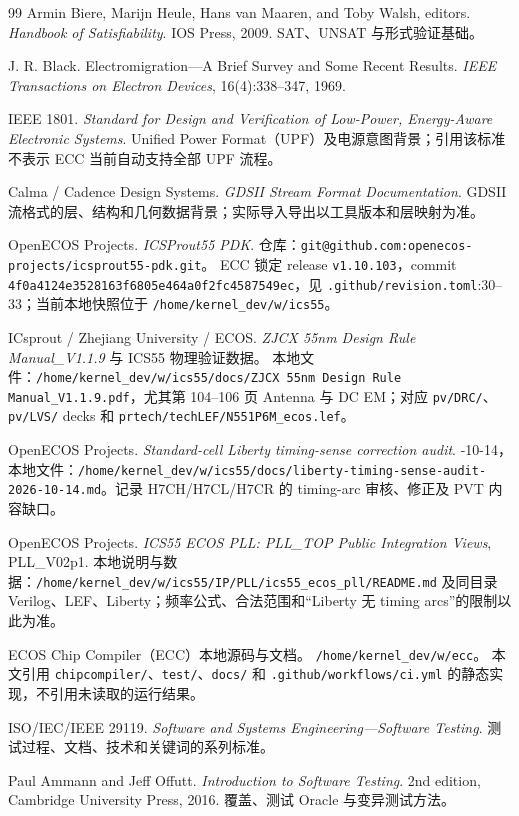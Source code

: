 \documentclass[UTF8,a4paper,11pt,fontset=fandol]{ctexart}
\numberwithin{equation}{section}
\newcommand{\code}[1]{\nolinkurl{#1}}
\begin{document}
\begin{thebibliography}{99}
Armin Biere, Marijn Heule, Hans van Maaren, and Toby Walsh, editors.
\newblock \emph{Handbook of Satisfiability}.
\newblock IOS Press, 2009. SAT、UNSAT 与形式验证基础。

J. R. Black.
\newblock Electromigration---A Brief Survey and Some Recent Results.
\newblock \emph{IEEE Transactions on Electron Devices}, 16(4):338--347, 1969.

IEEE 1801.
\newblock \emph{Standard for Design and Verification of Low-Power, Energy-Aware Electronic Systems}.
\newblock Unified Power Format（UPF）及电源意图背景；引用该标准不表示 ECC 当前自动支持全部 UPF 流程。

Calma / Cadence Design Systems.
\newblock \emph{GDSII Stream Format Documentation}.
\newblock GDSII 流格式的层、结构和几何数据背景；实际导入导出以工具版本和层映射为准。

OpenECOS Projects.
\newblock \emph{ICSProut55 PDK}.
\newblock 仓库：\code{git@github.com:openecos-projects/icsprout55-pdk.git}。
ECC 锁定 release \code{v1.10.103}，commit \code{4f0a4124e3528163f6805e464a0f2fc4587549ec}，见 \code{.github/revision.toml}:30--33；当前本地快照位于 \code{/home/kernel_dev/w/ics55}。

ICsprout / Zhejiang University / ECOS.
\newblock \emph{ZJCX 55nm Design Rule Manual\_V1.1.9} 与 ICS55 物理验证数据。
\newblock 本地文件：\code{/home/kernel_dev/w/ics55/docs/ZJCX 55nm Design Rule Manual_V1.1.9.pdf}，尤其第 104--106 页 Antenna 与 DC EM；对应 \code{pv/DRC/}、\code{pv/LVS/} decks 和 \code{prtech/techLEF/N551P6M_ecos.lef}。

OpenECOS Projects.
\newblock \emph{Standard-cell Liberty timing-sense correction audit}.
-10-14，本地文件：\code{/home/kernel_dev/w/ics55/docs/liberty-timing-sense-audit-2026-10-14.md}。记录 H7CH/H7CL/H7CR 的 timing-arc 审核、修正及 PVT 内容缺口。

OpenECOS Projects.
\newblock \emph{ICS55 ECOS PLL: PLL\_TOP Public Integration Views}, PLL\_V02p1.
\newblock 本地说明与数据：\code{/home/kernel_dev/w/ics55/IP/PLL/ics55_ecos_pll/README.md} 及同目录 Verilog、LEF、Liberty；频率公式、合法范围和“Liberty 无 timing arcs”的限制以此为准。

ECOS Chip Compiler（ECC）本地源码与文档。
\newblock \code{/home/kernel_dev/w/ecc}。
本文引用 \code{chipcompiler/}、\code{test/}、\code{docs/} 和 \code{.github/workflows/ci.yml} 的静态实现，不引用未读取的运行结果。

ISO/IEC/IEEE 29119.
\newblock \emph{Software and Systems Engineering---Software Testing}.
\newblock 测试过程、文档、技术和关键词的系列标准。

Paul Ammann and Jeff Offutt.
\newblock \emph{Introduction to Software Testing}.
\newblock 2nd edition, Cambridge University Press, 2016. 覆盖、测试 Oracle 与变异测试方法。

\end{thebibliography}
\end{document}
